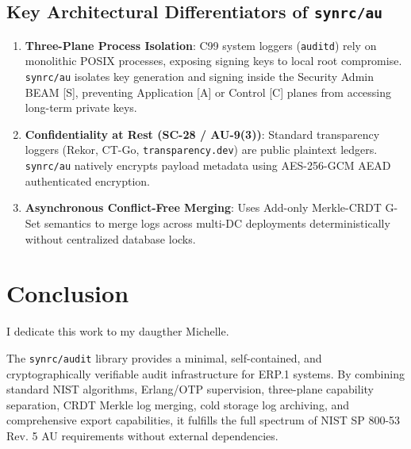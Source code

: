\documentclass{article}
\begin{document}
\subsection{Key Architectural Differentiators of \texttt{synrc/au}}
\begin{enumerate}
    \item \textbf{Three-Plane Process Isolation}: C99 system loggers (\texttt{auditd}) rely on monolithic POSIX processes, exposing signing keys to local root compromise. \texttt{synrc/au} isolates key generation and signing inside the Security Admin BEAM [S], preventing Application [A] or Control [C] planes from accessing long-term private keys.
    \item \textbf{Confidentiality at Rest (SC-28 / AU-9(3))}: Standard transparency loggers (Rekor, CT-Go, \texttt{transparency.dev}) are public plaintext ledgers. \texttt{synrc/au} natively encrypts payload metadata using AES-256-GCM AEAD authenticated encryption.
    \item \textbf{Asynchronous Conflict-Free Merging}: Uses Add-only Merkle-CRDT G-Set semantics to merge logs across multi-DC deployments deterministically without centralized database locks.
\end{enumerate}

\section{Conclusion}

I dedicate this work to my daugther Michelle.

The \texttt{synrc/audit} library provides a minimal, self-contained, and cryptographically
verifiable audit infrastructure for ERP.1 systems. By combining standard NIST algorithms,
Erlang/OTP supervision, three-plane capability separation, CRDT Merkle log merging,
cold storage log archiving, and comprehensive export capabilities, it fulfills the full
spectrum of NIST SP 800-53 Rev. 5 AU requirements without external dependencies.
\end{document}

